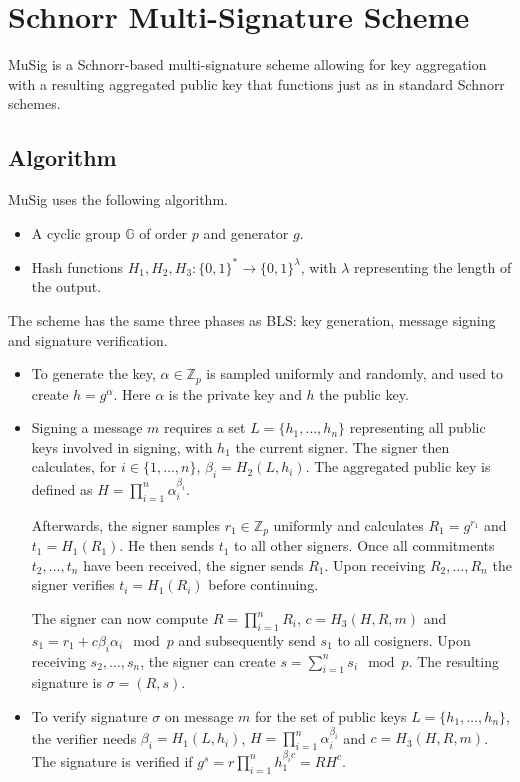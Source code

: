 \chapter{Schnorr Multi-Signature Scheme} \label{SchnorrMulti}
MuSig \cite{SchnorrMulti} is a Schnorr-based multi-signature scheme allowing for key aggregation with a resulting aggregated public key that functions just as in standard Schnorr schemes. 
\section{Algorithm}
MuSig uses the following algorithm.
\begin{itemize}
	\item A cyclic group $\mathbb{G}$ of order $p$ and generator $g$.
	\item Hash functions $H_1,H_2,H_3: \{0,1\}^*\to\{0,1\}^\lambda$, with $\lambda$ representing the length of the output.
\end{itemize}
The scheme has the same three phases as BLS: key generation, message signing and signature verification.
\begin{itemize}
	\item To generate the key, $\alpha\in\mathbb{Z}_p$ is sampled uniformly and randomly, and used to create $h=g^\alpha$. Here $\alpha$ is the private key and $h$ the public key.
	\item Signing a message $m$ requires a set $L=\{h_1,\dots,h_n\}$ representing all public keys involved in signing, with $h_1$ the current signer. The signer then calculates, for $i\in\{1,\dots,n\}$, $\beta_i=H_2(L,h_i)$. The aggregated public key is defined as $H=\prod_{i=1}^{n}\alpha_i^{\beta_i}$.
	
	Afterwards, the signer samples $r_1\in\mathbb{Z}_p$ uniformly and calculates $R_1=g^{r_1}$ and $t_1=H_1(R_1)$. He then sends $t_1$ to all other signers. Once all commitments $t_2,\dots,t_n$ have been received, the signer sends $R_1$. Upon receiving $R_2,\dots,R_n$ the signer verifies $t_i=H_1(R_i)$ before continuing.
	
	The signer can now compute $R=\prod_{i=1}^{n}R_i$, $c=H_3(H,R,m)$ and $s_1=r_1+c\beta_i\alpha_i\mod{p}$ and subsequently send $s_1$ to all cosigners. Upon receiving $s_2,\dots,s_n$, the signer can create $s=\sum_{i=1}^{n}s_i\mod{p}$. The resulting signature is $\sigma=(R,s)$.
	\item To verify signature $\sigma$ on message $m$ for the set of public keys $L=\{h_1,\dots,h_n\}$, the verifier needs $\beta_i=H_1(L,h_i)$, $H=\prod_{i=1}^{n}\alpha_i^{\beta_i}$ and $c=H_3(H,R,m)$. The signature is verified if $g^s=r\prod_{i=1}^{n}h_1^{\beta_ic}=RH^c$.
\end{itemize}
